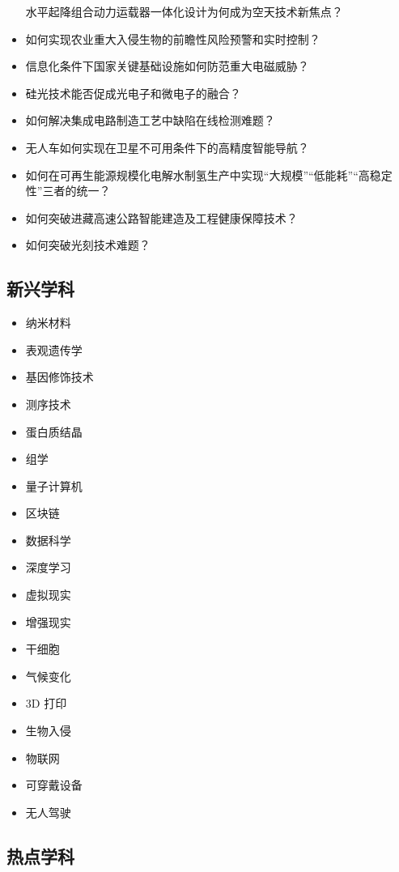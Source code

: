 \documentclass[]{tufte-book}
\providecommand{\tightlist}{%
  \setlength{\itemsep}{0pt}\setlength{\parskip}{0pt}}
\begin{document}
\begin{itemize}
  水平起降组合动力运载器一体化设计为何成为空天技术新焦点？
\item
  如何实现农业重大入侵生物的前瞻性风险预警和实时控制？
\item
  信息化条件下国家关键基础设施如何防范重大电磁威胁？
\item
  硅光技术能否促成光电子和微电子的融合？
\item
  如何解决集成电路制造工艺中缺陷在线检测难题？
\item
  无人车如何实现在卫星不可用条件下的高精度智能导航？
\item
  如何在可再生能源规模化电解水制氢生产中实现``大规模''``低能耗''``高稳定性''三者的统一？
\item
  如何突破进藏高速公路智能建造及工程健康保障技术？
\item
  如何突破光刻技术难题？
\end{itemize}

\hypertarget{ux65b0ux5174ux5b66ux79d1}{%
\subsection{新兴学科}\label{ux65b0ux5174ux5b66ux79d1}}

\begin{itemize}
\tightlist
\item
  纳米材料
\item
  表观遗传学
\item
  基因修饰技术
\item
  测序技术
\item
  蛋白质结晶
\item
  组学
\item
  量子计算机
\item
  区块链
\item
  数据科学
\item
  深度学习
\item
  虚拟现实
\item
  增强现实
\item
  干细胞
\item
  气候变化
\item
  3D 打印
\item
  生物入侵
\item
  物联网
\item
  可穿戴设备
\item
  无人驾驶
\end{itemize}

\hypertarget{ux70edux70b9ux5b66ux79d1}{%
\subsection{热点学科}\label{ux70edux70b9ux5b66ux79d1}}
\end{document}
